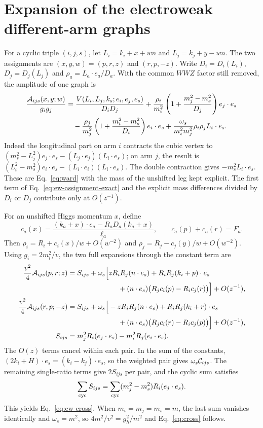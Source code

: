 \documentclass[11pt,a4paper]{article}
\begin{document}
\appendix
\section{Expansion of the electroweak different-arm graphs}
\label{app:ew-cross}
For a cyclic triple \((i,j,s)\), let
\(L_i=k_i+x+wn\) and \(L_j=k_j+y-wn\).
The two assignments are \((x,y,w)=(p,r,z)\) and \((r,p,-z)\).
Write \(D_i=D_i(L_i)\), \(D_j=D_j(L_j)\) and
\(\rho_a=L_a\cdot e_a/D_a\). With the common \(WWZ\)
factor still removed, the amplitude of one graph is
\begin{align}
 \frac{{\cal A}_{ijs}(x,y;w)}{g_i g_j}
 &=\frac{V(L_i,L_j,k_s;e_i,e_j,e_s)}{D_iD_j}
   +\frac{\rho_i}{m_i^2}\left(1+\frac{m_j^2-m_s^2}{D_j}\right)
          e_j\cdot e_s\nonumber\\
 &\quad-\frac{\rho_j}{m_j^2}\left(1+\frac{m_i^2-m_s^2}{D_i}\right)
          e_i\cdot e_s
   +\frac{\omega_s}{m_i^2m_j^2}\rho_i\rho_j L_i\cdot e_s.
 \label{eq:ew-assignment-exact}
\end{align}
Indeed the longitudinal part on arm \(i\) contracts the cubic
vertex to \((m_s^2-L_j^2)e_j\cdot e_s
-(L_j\cdot e_j)(L_i\cdot e_s)\); on arm \(j\), the result is
\((L_i^2-m_s^2)e_i\cdot e_s
-(L_i\cdot e_i)(L_i\cdot e_s)\). The double contraction gives
\(-m_s^2 L_i\cdot e_s\). These are Eq.~\eqref{eq:ward}
with the mass of the unshifted leg kept explicit. The first term of
Eq.~\eqref{eq:ew-assignment-exact} and the explicit mass differences
divided by \(D_i\) or \(D_j\) contribute only at \(O(z^{-1})\).

For an unshifted Higgs momentum \(x\), define
\[
 c_a(x)=\frac{(k_a+x)\cdot e_a-R_aD_a(k_a+x)}{\ell_a},
 \qquad c_a(p)+c_a(r)=F_a .
\]
Then \(\rho_i=R_i+c_i(x)/w+O(w^{-2})\) and
\(\rho_j=R_j-c_j(y)/w+O(w^{-2})\).
Using \(g_i=2m_i^2/v\), the two full expansions through the
constant term are
\begin{align}
 \frac{v^2}{4}{\cal A}_{ijs}(p,r;z)
 &=S_{ijs}+\omega_s\Big[
     zR_iR_j(n\cdot e_s)+R_iR_j(k_i+p)\cdot e_s
       \nonumber\\
 &\hspace{25mm}+(n\cdot e_s)\big(R_jc_i(p)-R_ic_j(r)\big)\Big]
       +O(z^{-1}),\nonumber\\
 \frac{v^2}{4}{\cal A}_{ijs}(r,p;-z)
 &=S_{ijs}+\omega_s\Big[
     -zR_iR_j(n\cdot e_s)+R_iR_j(k_i+r)\cdot e_s
       \nonumber\\
 &\hspace{25mm}+(n\cdot e_s)\big(R_jc_i(r)-R_ic_j(p)\big)\Big]
       +O(z^{-1}),
 \label{eq:ew-assignment-expand}\\
 S_{ijs}&=m_j^2 R_i(e_j\cdot e_s)-m_i^2 R_j(e_i\cdot e_s).
 \nonumber
\end{align}
The \(O(z)\) terms cancel within each pair. In the sum of the
constants, \((2k_i+H)\cdot e_s=(k_i-k_j)\cdot e_s\), so the
weighted pair gives \(\omega_s{\cal C}_{ijs}\). The remaining
single-ratio terms give \(2S_{ijs}\) per pair, and the cyclic sum
satisfies
\[
 \sum_{\rm cyc} S_{ijs}
   =\sum_{\rm cyc}(m_j^2-m_s^2)R_i(e_j\cdot e_s).
\]
This yields Eq.~\eqref{eq:ew-cross}. When \(m_i=m_j=m_s=m\),
the last sum vanishes identically and \(\omega_s=m^2\), so
\(4m^2/v^2=g_h^2/m^2\) and Eq.~\eqref{eq:cross} follows.
\end{document}

